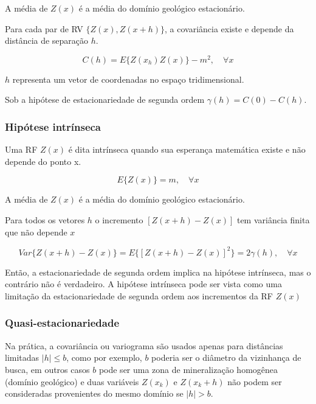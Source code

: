A média de $Z(x)$ é a média do domínio geológico estacionário.
					
Para cada par de RV $\{Z(x),Z(x+h)\}$, a covariância existe e depende da distância de separação $h$.
					
\begin{equation}
	C(h)=E\{Z(x_h)Z(x)\}-m^2, \quad \forall x
\end{equation}
					
$h$ representa um vetor de coordenadas no espaço tridimensional.
					
Sob a hipótese de estacionariedade de segunda ordem $\gamma(h)=C(0)-C(h)$.
			
\subsubsection{Hipótese intrínseca}
				
Uma RF $Z(x)$ é dita intrínseca quando sua esperança matemática existe e não depende do ponto x.
				
\begin{equation}
	E\{Z(x)\}=m, \quad \forall x
\end{equation}
				
A média de $Z(x)$ é a média do domínio geológico estacionário.

Para todos os vetores $h$ o incremento $[Z(x+h)-Z(x)]$ tem variância finita que não depende $x$
				
\begin{equation}
	Var\{Z(x+h)-Z(x)\}=E\{[Z(x+h)-Z(x)]^2\}=2\gamma(h), \quad \forall x
\end{equation}
				
Então, a estacionariedade de segunda ordem implica na hipótese intrínseca, mas o contrário não é verdadeiro. A hipótese intrínseca pode ser vista como uma limitação da estacionariedade de segunda ordem aos incrementos da RF $Z(x)$
				
\subsubsection{Quasi-estacionariedade}
			
Na prática, a covariância ou variograma são usados apenas para distâncias limitadas $|h| \le b$, como por exemplo, $b$ poderia ser o diâmetro da vizinhança de busca, em outros casos $b$ pode ser uma zona de mineralização homogênea (domínio geológico) e duas variáveis $Z(x_k)$ e $Z(x_k+h)$ não podem ser consideradas provenientes do mesmo domínio se $|h|>b$.
				
